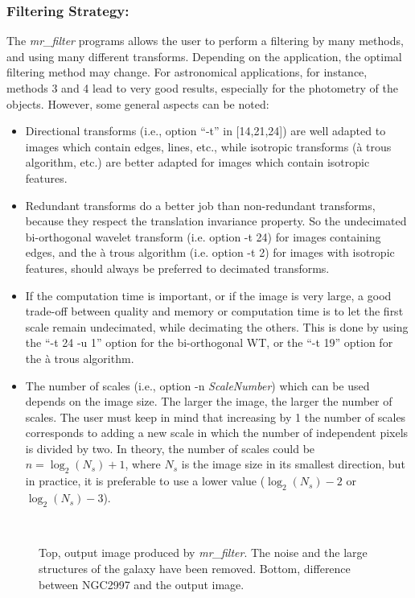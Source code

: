 \begin{itemize}
\subsubsection*{Filtering Strategy:}
The {\em mr\_filter} programs allows the user to perform a filtering by 
many methods, and using many different transforms. Depending on the
application, the optimal filtering method may change. For 
astronomical applications, for instance, methods 3 and 4 lead to very good
results, especially for the photometry of the objects. However, some
general aspects can be noted:
\begin{itemize}
\baselineskip=0.4truecm
\item Directional transforms (i.e., option  ``-t'' in [14,21,24]) are well
adapted to images which contain edges, lines, etc., while isotropic
transforms (\`a trous algorithm, etc.) are better adapted for images
which contain isotropic features.
\item Redundant transforms do a better job than non-redundant transforms, 
because they respect the translation invariance property.
So the undecimated bi-orthogonal wavelet transform (i.e. option  -t 24) for 
images containing edges, and the \`a trous algorithm (i.e. option  -t 2)
for images with isotropic features, should always be preferred to decimated
transforms.
\item If the computation time is important, or if the image is very large,
a good trade-off between quality and memory or computation time is to 
let the first scale remain undecimated, while decimating the others. 
This is done by using
the ``-t 24 -u 1'' option for the bi-orthogonal WT, or the ``-t 19'' 
option for
the \`a trous algorithm.
\item The number of scales (i.e., option  -n {\em ScaleNumber}) 
which can be used
depends on the image size. The larger the image, the 
larger the number of scales.
The user must keep in mind that increasing by 1 the number of scales 
corresponds
to adding a new scale in which the number of independent pixels is divided by two.
In theory, the number of scales could be $n = \log_2(N_s)+1$, where $N_s$ is the
image size in its smallest direction, but in practice, it is preferable to
use a lower value ($\log_2(N_s) -2$ or $\log_2(N_s) -3$). 
\end{itemize}


\begin{figure}[htb]
\centerline{
\vbox{
\hbox{
}
\hbox{
}}}
\caption{Top, output image produced by {\em mr\_filter}. The noise and the
large structures of the galaxy have been removed. Bottom,
difference between NGC2997 and the output image.}
\label{fig_ngc_clean}
\end{figure}


\end{itemize}
